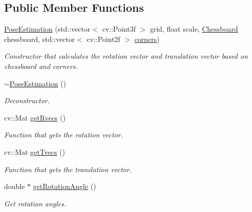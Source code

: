 \subsection*{Public Member Functions}
\begin{DoxyCompactItemize}
\item 
\hyperlink{class_pose_estimation_a74fd22a29c472c35ad6d184f7d2761ca}{Pose\+Estimation} (std\+::vector$<$ cv\+::\+Point3f $>$ grid, float scale, \hyperlink{class_chessboard}{Chessboard} chessboard, std\+::vector$<$ cv\+::\+Point2f $>$ \hyperlink{class_pose_estimation_a2cfe879dc7fe7841709b3e22d306f7c0}{corners})
\begin{DoxyCompactList}\small\item\em Constructor that calculates the rotation vector and translation vector based on chessboard and corners. \end{DoxyCompactList}\item 
\hyperlink{class_pose_estimation_ae50cca9fa13a705c4e71f3607e88fed5}{$\sim$\+Pose\+Estimation} ()
\begin{DoxyCompactList}\small\item\em Deconstructor. \end{DoxyCompactList}\item 
cv\+::\+Mat \hyperlink{class_pose_estimation_a7623a2e105e03b2994654b17a41b12ea}{get\+Rvecs} ()
\begin{DoxyCompactList}\small\item\em Function that gets the rotation vector. \end{DoxyCompactList}\item 
cv\+::\+Mat \hyperlink{class_pose_estimation_a2b02f885606ca11898a5aa3f6bf04b31}{get\+Tvecs} ()
\begin{DoxyCompactList}\small\item\em Function that gets the translation vector. \end{DoxyCompactList}\item 
double $\ast$ \hyperlink{class_pose_estimation_a4fe253f2290df2645631999128081ea4}{get\+Rotation\+Angle} ()
\begin{DoxyCompactList}\small\item\em Get rotation angles. \end{DoxyCompactList}\end{DoxyCompactItemize}

